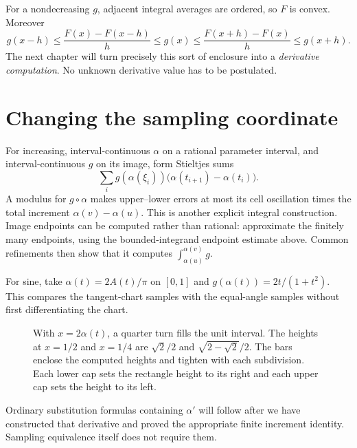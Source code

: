 For a nondecreasing $g$, adjacent integral averages are ordered, so $F$
is convex.  Moreover
\[
 g(x-h)\le\frac{F(x)-F(x-h)}h\le g(x)
 \le\frac{F(x+h)-F(x)}h\le g(x+h).
\]
The next chapter will turn precisely this sort of enclosure into a
\emph{derivative computation}.  No unknown derivative value has to be
postulated.

\section{Changing the sampling coordinate}
For increasing, interval-continuous $\alpha$ on a rational parameter
interval, and interval-continuous $g$ on its image, form Stieltjes sums
\[
 \sum_i g(\alpha(\xi_i))
          \bigl(\alpha(t_{i+1})-\alpha(t_i)\bigr).
\]
A modulus for $g\circ\alpha$ makes upper--lower errors at most its cell
oscillation times the total increment $\alpha(v)-\alpha(u)$.  This is
another explicit integral construction.  Image endpoints can be computed
rather than rational: approximate the finitely many endpoints, using the
bounded-integrand endpoint estimate above.  Common refinements then show
that it computes $\int_{\alpha(u)}^{\alpha(v)}g$.

For sine, take $\alpha(t)=2A(t)/\pi$ on $[0,1]$ and
$g(\alpha(t))=2t/(1+t^2)$.  This compares the tangent-chart samples with
the equal-angle samples without first differentiating the chart.

\begin{figure}[htbp]\centering
\intervalSineIntegralStageAnimation
\caption{With \(x=2\alpha(t)\), a quarter turn fills the unit interval.
The heights at \(x=1/2\) and \(x=1/4\) are \(\sqrt{2}/2\) and
\(\sqrt{2-\sqrt{2}}/2\). The bars enclose the computed heights and tighten
with each subdivision. Each lower cap sets the rectangle height to its
right and each upper cap sets the height to its left.}
\end{figure}

Ordinary substitution formulas containing $\alpha'$ will follow after
we have constructed that derivative and proved the appropriate finite
increment identity.  Sampling equivalence itself does not require them.


